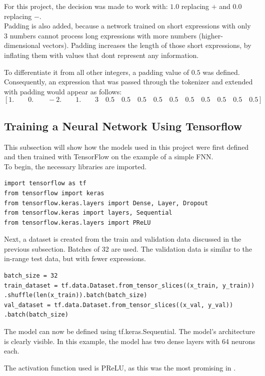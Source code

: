 \documentclass{article}
\begin{document}
For this project, the decision was made to work with: $1.0$ replacing $+$ and $0.0$ replacing $-$.
\\[1em]
Padding is also added, because a network trained on short expressions with only 3 numbers cannot process long expressions with more numbers (higher-dimensional vectors). Padding increases the length of those short expressions, by inflating them with values that dont represent any information.

To differentiate it from all other integers, a padding value of $0.5$ was defined.
\\[1em]
Consequently, an expression that was passed through the tokenizer and extended with padding would appear as follows:
$$
[1.\qquad 0.\qquad -2.\qquad 1.\qquad 3\quad 0.5\quad 0.5\quad 0.5\quad 0.5\quad 0.5\quad 0.5\quad 0.5\quad 0.5\quad 0.5\quad 0.5]
$$
\subsection{Training a Neural Network Using Tensorflow}
This subsection will show how the models used in this project were first defined and then trained with TensorFlow on the example of a simple FNN.
\\[2em]
To begin, the necessary libraries are imported.
\begin{Verbatim}
import tensorflow as tf
from tensorflow import keras
from tensorflow.keras.layers import Dense, Layer, Dropout
from tensorflow.keras import layers, Sequential
from tensorflow.keras.layers import PReLU
\end{Verbatim}

Next, a dataset is created from the train and validation data discussed in the previous subsection. Batches of 32 are used. The validation data is similar to the in-range test data, but with fewer expressions.
\begin{Verbatim}
batch_size = 32
train_dataset = tf.data.Dataset.from_tensor_slices((x_train, y_train))
.shuffle(len(x_train)).batch(batch_size)
val_dataset = tf.data.Dataset.from_tensor_slices((x_val, y_val))
.batch(batch_size)
\end{Verbatim}

The model can now be defined using tf.keras.Sequential. The model's architecture is clearly visible. In this example, the model has two dense layers with 64 neurons each.

The activation function used is PReLU, as this was the most promising in \cite{trask2018neuralarithmeticlogicunits}.
\end{document}
